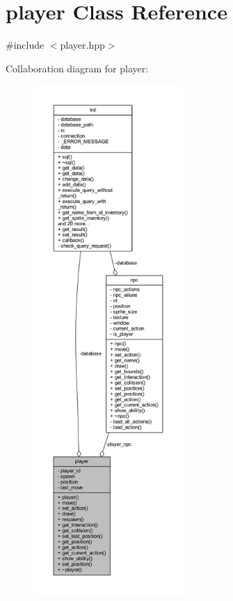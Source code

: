 \hypertarget{classplayer}{}\section{player Class Reference}
\label{classplayer}


{\ttfamily \#include $<$player.\+hpp$>$}



Collaboration diagram for player\+:
\nopagebreak
\begin{figure}[H]
\begin{center}
\leavevmode
\includegraphics[height=550pt]{classplayer__coll__graph}
\end{center}
\end{figure}
